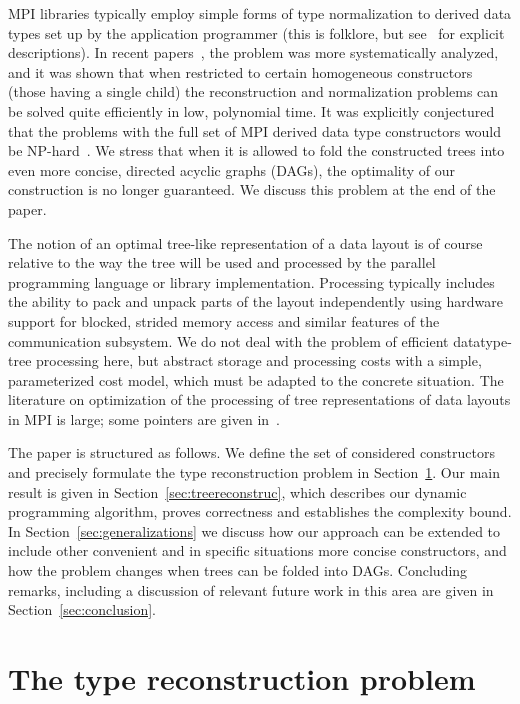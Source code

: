 \documentclass[a4paper,11pt]{article}
\begin{document}
MPI libraries typically employ simple forms of type normalization to
derived data types set up by the application programmer (this is
folklore, but
see~\cite{KjolstadHoeflerSnir11,KjolstadHoeflerSnir12,RossMillerGropp03}
for explicit descriptions). In recent
papers~\cite{Traff14:normalization,Traff15:mpilinear}, the problem was
more systematically analyzed, and it was shown that when restricted to
certain homogeneous constructors (those having a single child) the
reconstruction and normalization problems can be solved quite
efficiently in low, polynomial time. It was explicitly conjectured 
that the problems with the full set of MPI derived data type 
constructors would be NP-hard~\cite{Traff15:mpilinear, Traff11:typeguide}. 
We stress that when it is allowed to fold the constructed
trees into even more concise, directed acyclic graphs (DAGs), the
optimality of our construction is no longer guaranteed. We discuss
this problem at the end of the paper.

The notion of an optimal tree-like representation of a data layout is
of course relative to the way the tree will be used and processed by
the parallel programming language or library
implementation. Processing typically includes the ability to pack and
unpack parts of the layout independently using hardware support for
blocked, strided memory access and similar features of the
communication subsystem. We do not deal with the problem of efficient
datatype-tree processing here, but abstract storage and processing
costs with a simple, parameterized cost model, which must be adapted
to the concrete situation. The literature on optimization of the
processing of tree representations of data layouts in MPI is large;
some pointers are given in~\cite{Traff14:normalization}.

The paper is structured as follows. We define the set of considered
constructors and precisely formulate the type reconstruction problem
in Section~\ref{sec:problem}.  Our main result is given in
Section~\ref{sec:treereconstruc}, which describes our dynamic
programming algorithm, proves correctness and establishes the
complexity bound. In Section~\ref{sec:generalizations} we discuss how
our approach can be extended to include other convenient and in
specific situations more concise constructors, and how the problem
changes when trees can be folded into DAGs. Concluding remarks,
including a discussion of relevant future work in this area are given
in Section~\ref{sec:conclusion}.

\section{The type reconstruction problem}
\label{sec:problem}
\end{document}

